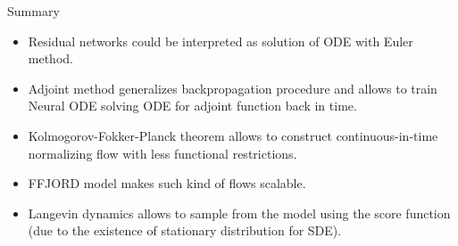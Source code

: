\begin{frame}{Summary}
	\begin{itemize}
		\item Residual networks could be interpreted as solution of ODE with Euler method.
		\vfill
		\item Adjoint method generalizes backpropagation procedure and allows to train Neural ODE solving ODE for adjoint function back in time.
		\vfill
		\item Kolmogorov-Fokker-Planck theorem allows to construct continuous-in-time normalizing flow with less functional restrictions.
		\vfill
		\item FFJORD model makes such kind of flows scalable.
		\vfill
		\item Langevin dynamics allows to sample from the model using the score function (due to the existence of stationary distribution for SDE).
	\end{itemize}
\end{frame}
 